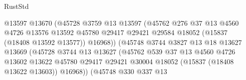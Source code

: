 \begin{lexlean}{RustStd}
\begin{coremodule}
{\begin{coremodule}
{{{{{{{{{{{{{{{{{{{{{{{{{{{{{{{{{{{{{{{{{{{{{{{{{{{{{{{{{{{{                                        @13597
                                        @13670
                                        (@45728
                                          @3759
                                          @13
                                          @13597
                                          (@45762
                                            @276
                                            @37
                                            @13
                                            @4560
                                            @4726
                                            @13576
                                            @13592
                                            @45780
                                            @29417
                                            @29421
                                            @29584
                                            @18052
                                            (@15837 (@18408 @13592 @13577))
                                            @16968))
                                        (@45748
                                          @3744
                                          @3827
                                          @13
                                          @18
                                          @13627
                                          @13669
                                          (@45728
                                            @3744
                                            @13
                                            @13627
                                            (@45762
                                              @539
                                              @37
                                              @13
                                              @4560
                                              @4726
                                              @13602
                                              @13622
                                              @45780
                                              @29417
                                              @29421
                                              @30004
                                              @18052
                                              (@15837 (@18408 @13622 @13603))
                                              @16968))
                                          (@45748
                                            @330
                                            @337
                                            @13
}}}}}}}}}}}}}}}}}}}}}}}}}}}}}}}}}}}}}}}}}}}}}}}}}}}}}}}}}}}}
\end{coremodule}}
\end{coremodule}
\end{lexlean}
